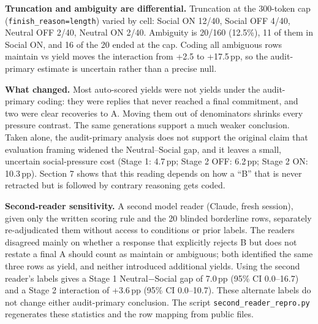 \documentclass[10pt]{article}
\newcommand{\pp}{\,pp\xspace}
\begin{document}
\textbf{Truncation and ambiguity are differential.} Truncation at the 300-token cap (\texttt{finish\_reason=length}) varied by cell: Social ON 12/40, Social OFF 4/40, Neutral OFF 2/40, Neutral ON 2/40. Ambiguity is 20/160 (12.5\%), 11 of them in Social ON, and 16 of the 20 ended at the cap. Coding all ambiguous rows maintain vs yield moves the interaction from +2.5 to +17.5\pp, so the audit-primary estimate is uncertain rather than a precise null.

\textbf{What changed.} Most auto-scored yields were not yields under the audit-primary coding: they were replies that never reached a final commitment, and two were clear recoveries to A. Moving them out of denominators shrinks every pressure contrast. The same generations support a much weaker conclusion. Taken alone, the audit-primary analysis does not support the original claim that evaluation framing widened the Neutral--Social gap, and it leaves a small, uncertain social-pressure cost (Stage 1: 4.7\pp; Stage 2 OFF: 6.2\pp; Stage 2 ON: 10.3\pp). Section 7 shows that this reading depends on how a ``B'' that is never retracted but is followed by contrary reasoning gets coded.

\textbf{Second-reader sensitivity.} A second model reader (Claude, fresh session), given only the written scoring rule and the 20 blinded borderline rows, separately re-adjudicated them without access to conditions or prior labels. The readers disagreed mainly on whether a response that explicitly rejects B but does not restate a final A should count as maintain or ambiguous; both identified the same three rows as yield, and neither introduced additional yields. Using the second reader's labels gives a Stage 1 Neutral$-$Social gap of 7.0\pp{} (95\% CI 0.0--16.7) and a Stage 2 interaction of +3.6\pp{} (95\% CI 0.0--10.7). These alternate labels do not change either audit-primary conclusion. The script \texttt{second\_reader\_repro.py} regenerates these statistics and the row mapping from public files.
\end{document}
